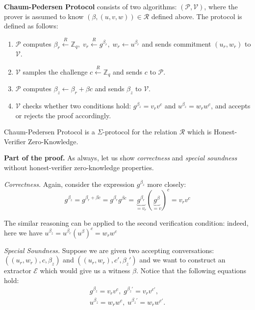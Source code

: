 \documentclass[../lecture-notes-105x135.tex]{subfiles}
\begin{document}
\vspace{-2mm}

\begin{definition}
    \textbf{Chaum-Pedersen Protocol} consists of two algorithms: $(\mathcal{P}, \mathcal{V})$, where the prover is assumed to know $(\beta,(u,v,w)) \in \mathcal{R}$ defined above. The protocol is defined as follows:
    \begin{enumerate}
        \item $\mathcal{P}$ computes $\beta_r \xleftarrow{R} \mathbb{Z}_q, \; v_r \xleftarrow{R} g^{\beta_r}, \; w_r \gets u^{\beta_r}$ and sends commitment $(u_r,w_r)$ to $\mathcal{V}$.
        \item $\mathcal{V}$ samples the challenge $c \xleftarrow{R} \mathbb{Z}_q$ and sends $c$ to $\mathcal{P}$.
        \item $\mathcal{P}$ computes $\beta_z \gets \beta_r + \beta c$ and sends $\beta_z$ to $\mathcal{V}$.
        \item $\mathcal{V}$ checks whether two conditions hold: $g^{\beta_z} = v_rv^c$ and $u^{\beta_z} = w_r w^c$, and accepts or rejects the proof accordingly.
    \end{enumerate}
\end{definition}

\vspace{-5mm}

\begin{theorem}
    Chaum-Pedersen Protocol is a $\Sigma$-protocol for the relation $\mathcal{R}$ which is Honest-Verifier Zero-Knowledge.
\end{theorem}

\vspace{-1mm}

\textbf{Part of the proof.} As always, let us show \textit{correctness} and \textit{special soundness} without honest-verifier zero-knowledge properties.

\textit{Correctness.} Again, consider the expression $g^{\beta_z}$ more closely:
\begin{equation*}
    g^{\beta_z} = g^{\beta_r + \beta c} = g^{\beta_r}g^{\beta c} = \underbrace{g^{\beta_r}}_{=v_r}(\underbrace{g^{\beta}}_{=v})^c = v_rv^c
\end{equation*}

The similar reasoning can be applied to the second verification condition: indeed, here we have $u^{\beta_z} = u^{\beta_r}(u^{\beta})^c = w_rw^c$

\textit{Special Soundness.} Suppose we are given two accepting conversations: $((u_r,w_r),c,\beta_z)$ and $((u_r,w_r),c',\beta_z')$ and we want to construct an extractor $\mathcal{E}$ which would give us a witness $\beta$. Notice that the following equations hold:
\begin{align*}
    g^{\beta_z} = v_rv^c, \; g^{\beta_z'} = v_rv^{c'}, \\ u^{\beta_z} = w_rw^c, \; u^{\beta_z'} = w_rw^{c'}.
\end{align*}
\end{document}
